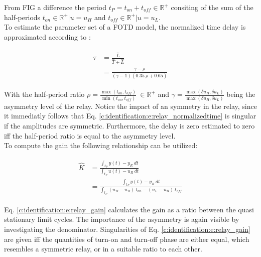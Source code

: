 From FIG a difference the period $t_P = t_{on} + t_{off}\in \mathbb{R}^+$ consiting of the sum of the half-periods $t_{on} \in \mathbb{R}^+ | u = u_H$ and $t_{off} \in \mathbb{R}^+ | u = u_L$.\\

To estimate the parameter set of a FOTD model, the normalized time delay is approximated according to \cite[p.26 f.]{Berner2015}:

\begin{align}
\begin{split}
\tau &= \frac{\hat{L}}{\hat{T}+\hat{L}} \\
 &= \frac{\gamma - \rho}{ \left(\gamma - 1\right)\left(0.35~\rho+0.65\right)}
\end{split}
\label{c:identification:e:relay_normalizedtime}
\end{align}

With the half-period ratio $\rho = \frac{\max\left(t_{on},t_{off} \right)}{\min\left(t_{on},t_{off} \right)} ~\in \mathbb{R}^+$ and $\gamma = \frac{\max\left(\delta u_H, \delta u_L \right)}{\max\left(\delta u_H, \delta u_L \right)}$ being the asymmetry level of the relay. Notice the impact of an symmetry in the relay, since it immediatly follows that Eq. \ref{c:identification:e:relay_normalizedtime} is singular if the amplitudes are symmetric. Furthermore, the delay is zero estimated to zero iff the half-period ratio is equal to the asymmetry level.\\

To compute the gain the following relationship can be utilized:

\begin{align}
\begin{split}
\hat{K} &= \frac{\int_{t_P} y(t)-y_R~dt}{\int_{t_P} u(t)-u_R~dt} \\
&= \frac{\int_{t_P} y(t)-y_R~dt}{\int_{t_P} \left( u_H -u_R \right)~t_{on} - \left( u_L - u_R \right)~t_{off}} 
\end{split}
\label{c:identification:e:relay_gain}
\end{align}

Eq. \ref{c:identification:e:relay_gain} calculates the gain as a ratio between the quasi stationary limit cycles. The importance of the asymmetry is again visible by investigating the denominator. Singularities of Eq. \ref{c:identification:e:relay_gain} are given iff the quantities of turn-on and turn-off phase are either equal, which resembles a symmetric relay, or in a suitable ratio to each other.\\

